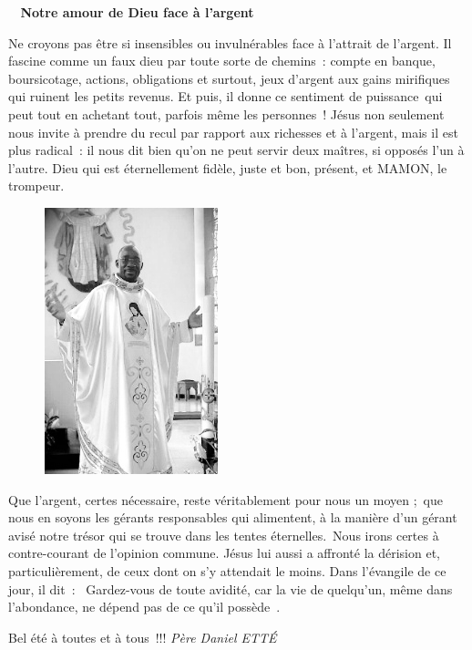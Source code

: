  \begin{center}
 \textbf{
\og 
Notre amour de Dieu face à l’argent
 \fg{}
 }
 \end{center}

Ne croyons pas être si insensibles ou invulnérables face à l’attrait de l’argent. Il fascine comme un faux dieu par toute sorte de chemins : compte en banque, boursicotage, actions, obligations et surtout, jeux d’argent aux gains mirifiques qui ruinent les petits revenus. Et puis, il donne ce sentiment de puissance qui peut tout en achetant tout, parfois même les personnes ! Jésus non seulement nous invite à prendre du recul par rapport aux richesses et à l’argent, mais il est plus radical : il nous dit bien qu’on ne peut servir deux maîtres, si opposés l’un à l’autre. Dieu qui est éternellement fidèle, juste et bon, présent, et MAMON, le trompeur.

\begin{figure}
\vspace{-0.4cm}
	\includegraphics[scale=1.20]{../images/standing_daniel}
\end{figure}
Que l’argent, certes nécessaire, reste véritablement pour nous un moyen ; que nous en soyons les \og gérants\fg{} responsables qui alimentent, à la manière d’un 
\og gérant avisé\fg{} notre trésor qui se trouve \og dans les tentes éternelles\fg{}. Nous irons certes à contre-courant de l’opinion commune.
Jésus lui aussi a affronté la dérision et, particulièrement, de ceux dont on s’y attendait le moins. Dans l’évangile de ce jour, il dit : \og Gardez-vous de toute avidité, car la vie de quelqu’un, même dans l’abondance, ne dépend pas de ce qu’il possède \fg{}.


\begin{flushright}
Bel été à toutes et à tous !!!
\textit{Père  Daniel  ETTÉ}
\end{flushright}


